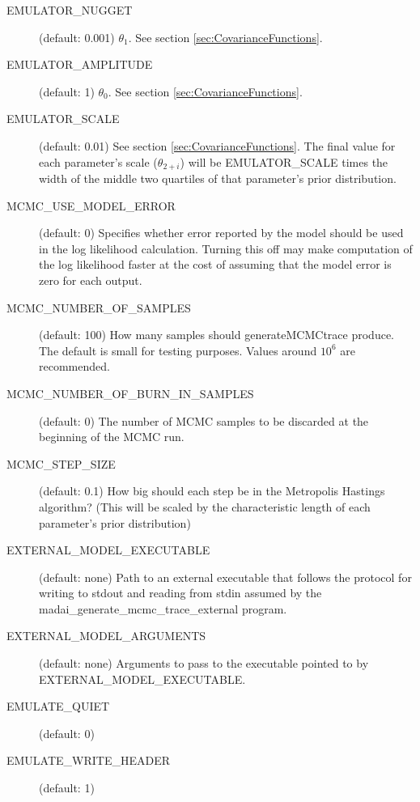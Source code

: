 \begin{description}
    \item[EMULATOR\_NUGGET] (default: 0.001) $\theta_1$. See section \ref{sec:CovarianceFunctions}.
    \item[EMULATOR\_AMPLITUDE] (default: 1) $\theta_0$. See section \ref{sec:CovarianceFunctions}.
    \item[EMULATOR\_SCALE] (default: 0.01) See section \ref{sec:CovarianceFunctions}. The final value for each parameter's scale ($\theta_{2+i}$) will be EMULATOR\_SCALE times the width of the middle two quartiles of that parameter's prior distribution.
    \item[MCMC\_USE\_MODEL\_ERROR] (default: 0) Specifies whether error reported by the model should be used in the log likelihood calculation. Turning this off may make computation of the log likelihood faster at the cost of assuming that the model error is zero for each output.
    \item[MCMC\_NUMBER\_OF\_SAMPLES] (default: 100) How many samples should generateMCMCtrace produce. The default is small for testing purposes. Values around $10^6$ are recommended.
    \item[MCMC\_NUMBER\_OF\_BURN\_IN\_SAMPLES] (default: 0) The number of MCMC samples to be discarded at the beginning of the MCMC run.
    \item[MCMC\_STEP\_SIZE] (default: 0.1) How big should each step be in the Metropolis Hastings algorithm? (This will be scaled by the characteristic length of each parameter's prior distribution)
    \item[EXTERNAL\_MODEL\_EXECUTABLE] (default: none) Path to an external executable that follows the protocol for writing to stdout and reading from stdin assumed by the madai\_generate\_mcmc\_trace\_external program.
    \item[EXTERNAL\_MODEL\_ARGUMENTS] (default: none) Arguments to pass to the executable pointed to by EXTERNAL\_MODEL\_EXECUTABLE.
    \item[EMULATE\_QUIET] (default: 0)
    \item[EMULATE\_WRITE\_HEADER] (default: 1)
\end{description}

